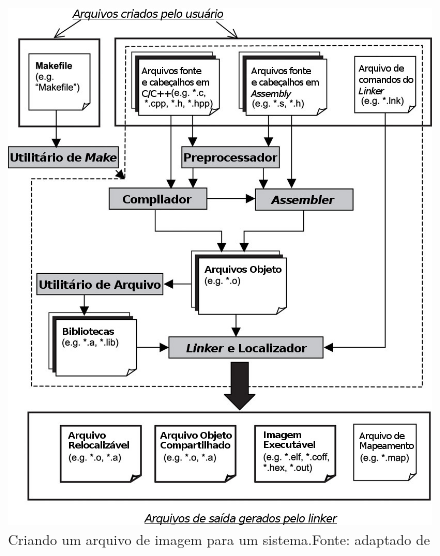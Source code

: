 \begin{figure}[H]
    \scriptsize
     \centering
     \includegraphics[scale=0.5]{dados/figuras/Linker.png}
     \caption{Criando um arquivo de imagem para um sistema.\newline Fonte: adaptado de \cite{Qing2003}}
     \label{linker}
\end{figure}



